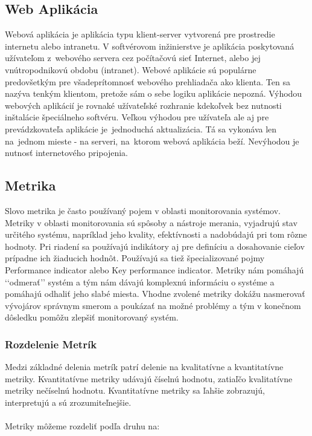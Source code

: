 \documentclass[a4paper, usesections, upjsfrontpage, disablespecwarning, thesismargins, thesislinespacing]{rnthesissvk}
\begin{document}
\subsection{Web Aplikácia}

Webová aplikácia je aplikácia typu klient-server vytvorená pre prostredie internetu alebo intranetu.
V softvérovom inžinierstve je aplikácia poskytovaná užívateľom z~webového servera cez počítačovú sieť Internet, 
alebo jej vnútropodni\-kovú obdobu (intranet). 
Webové aplikácie sú populárne predovšetkým pre všade\-prítomnosť webového prehliadača ako klienta. 
Ten sa nazýva tenkým klientom, pretože sám o sebe logiku aplikácie nepozná.
Výhodou webových aplikácií je rovnaké užívateľské rozhranie kdekoľvek bez nutnosti inštalácie špeciálneho softvéru. 
Veľkou výhodou pre užívateľa ale aj pre prevádzkovateľa aplikácie je~jednoduchá aktualizácia. 
Tá sa vykonáva len na~jednom mieste - na serveri, na~ktorom webová aplikácia beží. Nevýhodou je nutnosť internetového pripojenia.

\subsection{Metrika}
Slovo metrika je často používaný pojem v oblasti monitorovania systémov.
Metri\-ky v oblasti monitorovania sú spôsoby a nástroje merania, vyjadrujú stav určitého systému, 
napríklad jeho kvality, efektívnosti a nadobúdajú pri tom rôzne hodnoty. 
Pri riadení sa používajú indikátory aj pre definíciu a dosahovanie cieľov prípadne ich žiaducich hodnôt. 
Používajú sa tiež špecializované pojmy Performance indicator alebo Key performance indicator.
Metriky nám pomáhajú ‘‘odmerať’’ systém a tým nám dávajú komplexnú informáciu o systéme a pomáhajú odhaliť jeho slabé miesta.
Vhodne zvolené metriky dokážu nasmerovať vývojárov správnym smerom a poukázať na možné problémy a tým v konečnom dôsledku pomôžu zlepšiť monitorovaný systém.

\subsubsection{Rozdelenie Metrík}


Medzi základné delenia metrík patrí delenie na kvalitatívne a kvantitatívne metriky.
Kvantitatívne metriky udávajú číselnú hodnotu, zatiaľčo kvalitatívne metriky nečíselnú hodnotu.  
Kvantitatívne metriky sa ľahšie zobrazujú, interpretujú a sú zrozumiteľnejšie.
~\\
~\\
Metriky môžeme rozdeliť podľa druhu na:
\end{document}
